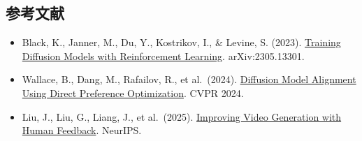\hypertarget{ux53c2ux8003ux6587ux732e-134}{%
\subsection{参考文献}\label{ux53c2ux8003ux6587ux732e-134}}

\vspace{0.25em}
\begin{itemize}
\tightlist
\item
  Black, K., Janner, M., Du, Y., Kostrikov, I., \& Levine, S. (2023). \href{https://arxiv.org/abs/2305.13301}{Training Diffusion Models with Reinforcement Learning}. arXiv:2305.13301.
\item
  Wallace, B., Dang, M., Rafailov, R., et al.~(2024). \href{https://arxiv.org/abs/2311.12908}{Diffusion Model Alignment Using Direct Preference Optimization}. CVPR 2024.
\item
  Liu, J., Liu, G., Liang, J., et al.~(2025). \href{https://arxiv.org/abs/2501.13918}{Improving Video Generation with Human Feedback}. NeurIPS.
\end{itemize}

\clearpage
